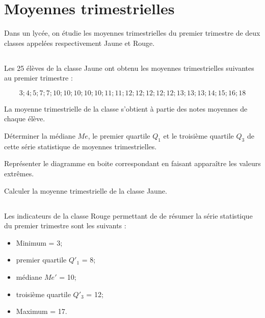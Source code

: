 \section{Moyennes trimestrielles}

Dans un lycée, on étudie les moyennes trimestrielles du premier trimestre de deux classes appelées respectivement Jaune et Rouge.

\subsection{}
Les 25 élèves de la classe Jaune ont obtenu les moyennes trimestrielles suivantes au premier trimestre :

\begin{equation*}
3 ; 4 ; 5 ; 7 ; 7 ; 10 ; 10 ; 10 ; 10 ; 10 ; 11 ;  11 ; 12 ; 12 ; 12 ; 12 ; 12 ; 13 ; 13 ; 13 ; 14 ; 15 ; 16 ; 18
\end{equation*}

La moyenne trimestrielle de la classe s'obtient à partie des notes moyennes de chaque élève.

\begin{questions}
	\question Déterminer la médiane $Me$, le premier quartile $Q_1$ et le troisième quartile $Q_3$ de cette série statistique de moyennes trimestrielles.
	
	\question Représenter le diagramme en boite correspondant en faisant apparaître les valeurs extrêmes.
	
	\question Calculer la moyenne trimestrielle de la classe Jaune.
\end{questions}

\subsection{}

Les indicateurs de la classe Rouge permettant de de résumer la série statistique du premier trimestre sont les suivants :

\begin{itemize}
	\item Minimum = 3;
	\item premier quartile $Q'_1$ = 8;
	\item médiane $Me'$ = 10;
	\item troisième quartile $Q'_3$ = 12;
	\item Maximum = 17.
\end{itemize}

